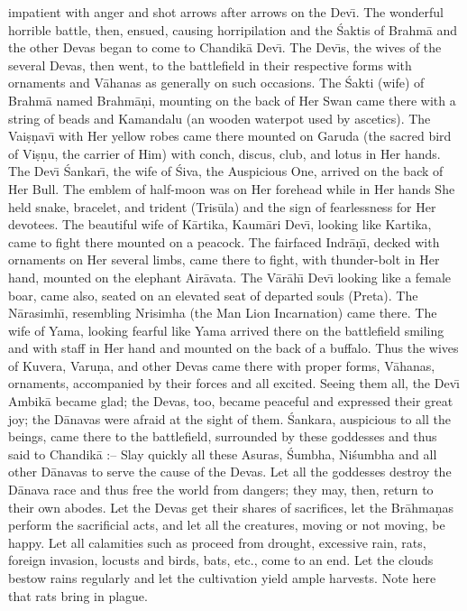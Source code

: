 impatient with anger and shot arrows after arrows on the Dev\={\i}. The wonderful horrible battle, then, ensued, causing horripilation and the \'Saktis of Brahm\=a and the other Devas began to come to Chandik\=a Dev\={\i}. The Dev\={\i}s, the wives of the several Devas, then went, to the battlefield in their respective forms with ornaments and V\=ahanas as generally on such occasions. The \'Sakti (wife) of Brahm\=a named Brahm\=a\d{n}i, mounting on the back of Her Swan came there with a string of beads and Kamandalu (an wooden waterpot used by ascetics). The Vai\d{s}\d{n}av\={\i} with Her yellow robes came there mounted on Garuda (the sacred bird of Vi\d{s}\d{n}u, the carrier of Him) with conch, discus, club, and lotus in Her hands. The Dev\={\i} \'Sankar\={\i}, the wife of \'Siva, the Auspicious One, arrived on the back of Her Bull. The emblem of half-moon was on Her forehead while in Her hands She held snake, bracelet, and trident (Tris\=ula) and the sign of fearlessness for Her devotees. The beautiful wife of K\=artika, Kaum\=ari Dev\={\i}, looking like Kartika, came to fight there mounted on a peacock. The fairfaced Indr\=a\d{n}\={\i}, decked with ornaments on Her several limbs, came there to fight, with thunder-bolt in Her hand, mounted on the elephant Air\=avata. The V\=ar\=ah\={\i} Dev\={\i} looking like a female boar, came also, seated on an elevated seat of departed souls (Preta). The N\=arasimh\={\i}, resembling Nrisimha (the Man Lion Incarnation) came there. The wife of Yama, looking fearful like Yama arrived there on the battlefield smiling and with staff in Her hand and mounted on the back of a buffalo. Thus the wives of Kuvera, Varu\d{n}a, and other Devas came there with proper forms, V\=ahanas, ornaments, accompanied by their forces and all excited. Seeing them all, the Dev\={\i} Ambik\=a became glad; the Devas, too, became peaceful and expressed their great joy; the D\=anavas were afraid at the sight of them. \'Sankara, auspicious to all the beings, came there to the battlefield, surrounded by these goddesses and thus said to Chandik\=a :-- Slay quickly all these Asuras, \'Sumbha, Ni\'sumbha and all other D\=anavas to serve the cause of the Devas. Let all the goddesses destroy the D\=anava race and thus free the world from dangers; they may, then, return to their own abodes. Let the Devas get their shares of sacrifices, let the Br\=ahma\d{n}as perform the sacrificial acts, and let all the creatures, moving or not moving, be happy. Let all calamities such as proceed from drought, excessive rain, rats, foreign invasion, locusts and birds, bats, etc., come to an end. Let the clouds bestow rains regularly and let the cultivation yield ample harvests. Note here that rats bring in plague.

